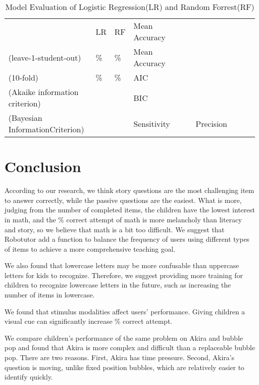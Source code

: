 \documentclass[hyperref]{ctexart}
\begin{document}
\begin{multicols}{2}
\begin{table}[H]
  \begin{tabular}{lll}
    \hline{}
    &\quad\quad LR\quad\quad& \quad RF&
    \hline
    Mean Accuracy\\(leave-1-student-out)&  \quad {}\%& \%& 
    \hline
    Mean Accuracy\\(10-fold)&       \quad {}\%& \%&
    \hline
    AIC\\(Akaike information criterion)&       \quad {}& &
    \hline
    BIC\\(Bayesian InformationCriterion)&       \quad {}& &
    \hline
    Sensitivity&       \quad {}& &
    \hline
    Precision&       \quad {}& &
    \hline
    \hline{}
  \end{tabular}
  \caption{Model Evaluation of Logistic Regression(LR) and Random Forrest(RF)}
\end{table}
	
\section{Conclusion}
According to our research, we think story questions are the most challenging item to answer correctly, while the passive questions are the easiest. What is more, judging from the number of completed items, the children have the lowest interest in math, and the \% correct attempt of math is more melancholy than literacy and story, so we believe that math is a bit too difficult. We suggest that Robotutor add a function to balance the frequency of users using different types of items to achieve a more comprehensive teaching goal.


We also found that lowercase letters may be more confusable than uppercase letters for kids to recognize. Therefore, we suggest providing more training for children to recognize lowercase letters in the future, such as increasing the number of items in lowercase.


We found that stimulus modalities affect users' performance. Giving children a visual cue can significantly increase \% correct attempt.


We compare children's performance of the same problem on Akira and bubble pop and found that Akira is more complex and difficult than a replaceable bubble pop. There are two reasons. First, Akira has time pressure. Second, Akira's question is moving, unlike fixed position bubbles, which are relatively easier to identify quickly.








\end{multicols}
\end{document}
